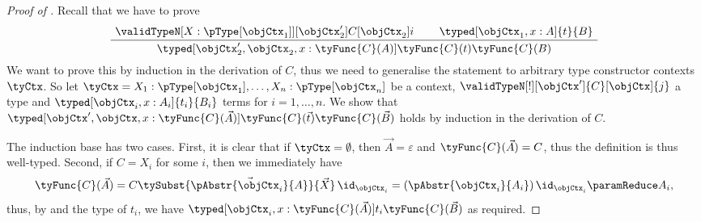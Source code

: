\documentclass[preprint]{sigplanconf}
\begin{document}
\begin{proof}[Proof of ]
  Recall that we have to prove
  \begin{equation*}
    \AxiomC{$
      \validTypeN[X: {\pType[\objCtx_1]}][\objCtx_2']{C}[\objCtx_2]{i}$}
    \AxiomC{$\typed[\objCtx_1, x : A]{t}{B}$}
    \BinaryInfC{$
      \typed[\objCtx_2', \objCtx_2, x : \tyFunc{C}(A)]
      {\tyFunc{C}(t)}{\tyFunc{C}(B)}$}
    \DisplayProof
  \end{equation*}
  We want to prove this by induction in the derivation of $C$,
  thus we need to generalise the statement to arbitrary type constructor
  contexts $\tyCtx$.
  So let
  $\tyCtx = X_1 : \pType[\objCtx_1], \dotsc, X_n : \pType[\objCtx_n]$
  be a context,
  $\validTypeN[!][\objCtx']{C}[\objCtx]{j}$
  a type and
  $\typed[\objCtx_i, x : A_i]{t_i}{B_i}$ terms for $i = 1, \dotsc, n$.
  We show that
  $\typed[\objCtx', \objCtx, x : \tyFunc{C}(\vec{A})]{\tyFunc{C}(\vec{t})}{\tyFunc{C}(\vec{B})}$
  holds by induction in the derivation of $C$.

  The induction base has two cases.
  First, it is clear that if $\tyCtx = \emptyset$, then $\vec{A} = \varepsilon$
  and $\tyFunc{C}(\vec{A}) = C$, thus the definition
  is thus well-typed.
  Second, if $C = X_i$ for some $i$, then we immediately have
  \begin{equation*}
    \tyFunc{C}(\vec{A})
    = C \tySubst{\vec{\pAbstr{\objCtx_i}{A}}}{\vec{X}} \, \id_{\objCtx_i}
    = (\pAbstr{\objCtx_i}{A_i}) \, \id_{\objCtx_i}
    \paramReduce A_i,
  \end{equation*}
  thus, by  and the type of $t_i$, we have
  $\typed[\objCtx_i, x : \tyFunc{C}(\vec{A})]{t_i}{\tyFunc{C}(\vec{B})}$ as
  required.


\end{proof}
\end{document}

